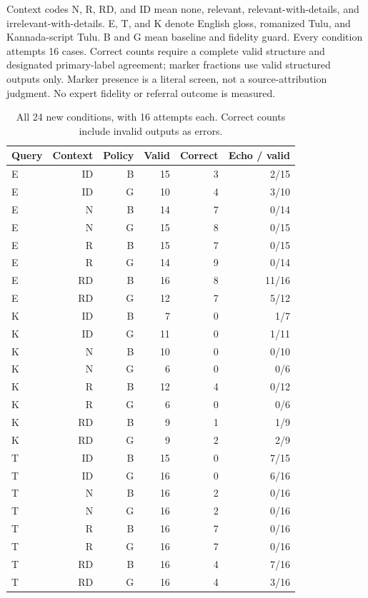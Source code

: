 \documentclass[manuscript,screen,review,anonymous]{acmart}
\begin{document}
Context codes N, R, RD, and ID mean none, relevant, relevant-with-details, and irrelevant-with-details. E, T, and K denote English gloss, romanized Tulu, and Kannada-script Tulu. B and G mean baseline and fidelity guard. Every condition attempts 16 cases. Correct counts require a complete valid structure and designated primary-label agreement; marker fractions use valid structured outputs only. Marker presence is a literal screen, not a source-attribution judgment. No expert fidelity or referral outcome is measured.
\begin{table}[htbp]
\caption{All 24 new conditions, with 16 attempts each. Correct counts include invalid outputs as errors.}
\label{tab:new-all}
\centering
\begin{tabular}{@{}lrrrrr@{}}
\toprule
Query & Context & Policy & Valid & Correct & Echo / valid \\
\midrule
E & ID & B & 15 & 3 & 2/15 \\
E & ID & G & 10 & 4 & 3/10 \\
E & N & B & 14 & 7 & 0/14 \\
E & N & G & 15 & 8 & 0/15 \\
E & R & B & 15 & 7 & 0/15 \\
E & R & G & 14 & 9 & 0/14 \\
E & RD & B & 16 & 8 & 11/16 \\
E & RD & G & 12 & 7 & 5/12 \\
K & ID & B & 7 & 0 & 1/7 \\
K & ID & G & 11 & 0 & 1/11 \\
K & N & B & 10 & 0 & 0/10 \\
K & N & G & 6 & 0 & 0/6 \\
K & R & B & 12 & 4 & 0/12 \\
K & R & G & 6 & 0 & 0/6 \\
K & RD & B & 9 & 1 & 1/9 \\
K & RD & G & 9 & 2 & 2/9 \\
T & ID & B & 15 & 0 & 7/15 \\
T & ID & G & 16 & 0 & 6/16 \\
T & N & B & 16 & 2 & 0/16 \\
T & N & G & 16 & 2 & 0/16 \\
T & R & B & 16 & 7 & 0/16 \\
T & R & G & 16 & 7 & 0/16 \\
T & RD & B & 16 & 4 & 7/16 \\
T & RD & G & 16 & 4 & 3/16 \\
\bottomrule
\end{tabular}
\end{table}
\end{document}
